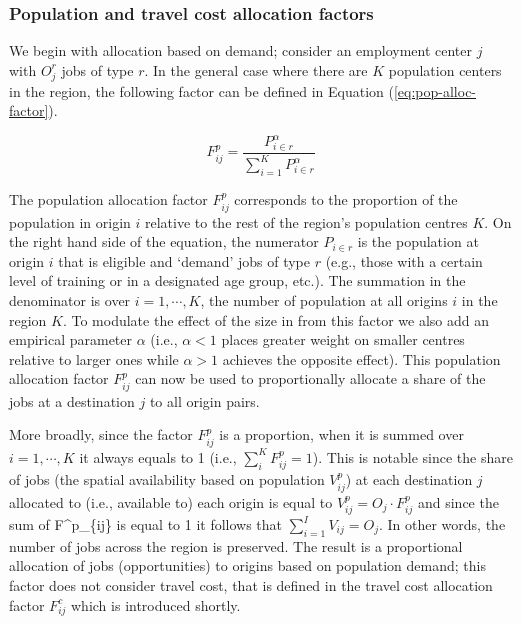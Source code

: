 \documentclass[]{elsarticle} %
\begin{document}
\hypertarget{population-and-travel-cost-allocation-factors}{%
\subsubsection{Population and travel cost allocation
factors}\label{population-and-travel-cost-allocation-factors}}

We begin with allocation based on demand; consider an employment center
\(j\) with \(O_j^r\) jobs of type \(r\). In the general case where there
are \(K\) population centers in the region, the following factor can be
defined in Equation (\ref{eq:pop-alloc-factor}).

\begin{equation}
\label{eq:pop-alloc-factor}
F^p_{ij} = \frac{P_{i\in r}^\alpha}{\sum_{i=1}^K P_{i\in r}^\alpha}
\end{equation}

The population allocation factor \(F^p_{ij}\) corresponds to the
proportion of the population in origin \(i\) relative to the rest of the
region's population centres \(K\). On the right hand side of the
equation, the numerator \(P_{i\in r}\) is the population at origin \(i\)
that is eligible and `demand' jobs of type \(r\) (e.g., those with a
certain level of training or in a designated age group, etc.). The
summation in the denominator is over \(i=1,\cdots,K\), the number of
population at all origins \(i\) in the region \(K\). To modulate the
effect of the size in from this factor we also add an empirical
parameter \(\alpha\) (i.e., \(\alpha <1\) places greater weight on
smaller centres relative to larger ones while \(\alpha>1\) achieves the
opposite effect). This population allocation factor \(F^p_{ij}\) can now
be used to proportionally allocate a share of the jobs at a destination
\(j\) to all origin pairs.

More broadly, since the factor \(F^p_{ij}\) is a proportion, when it is
summed over \(i=1,\cdots,K\) it always equals to 1 (i.e.,
\(\sum_i^{K} F^p_{ij} = 1\)). This is notable since the share of jobs
(the spatial availability based on population \(V^p_{ij}\)) at each
destination \(j\) allocated to (i.e., available to) each origin is equal
to \(V^p_{ij} = O_j \cdot F^p_{ij}\) and since the sum of F\^{}p\_\{ij\}
is equal to 1 it follows that \(\sum_{i=1}^I V_{ij} = O_j\). In other
words, the number of jobs across the region is preserved. The result is
a proportional allocation of jobs (opportunities) to origins based on
population demand; this factor does not consider travel cost, that is
defined in the travel cost allocation factor \(F^c_{ij}\) which is
introduced shortly.
\end{document}
